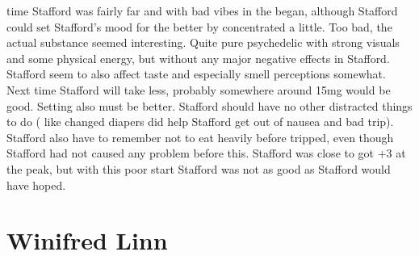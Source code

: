 \documentclass[12pt]{book}
\begin{document}
time Stafford was fairly far and with bad vibes in the began, although Stafford could set Stafford's mood for the better by concentrated a little. Too bad, the actual substance seemed interesting. Quite pure psychedelic with strong visuals and some physical energy, but without any major negative effects in Stafford. Stafford seem to also affect taste and especially smell perceptions somewhat. Next time Stafford will take less, probably somewhere around 15mg would be good. Setting also must be better. Stafford should have no other distracted things to do ( like changed diapers did help Stafford get out of nausea and bad trip). Stafford also have to remember not to eat heavily before tripped, even though Stafford had not caused any problem before this. Stafford was close to got +3 at the peak, but with this poor start Stafford was not as good as Stafford would have hoped.



\chapter{Winifred Linn}
\end{document}
